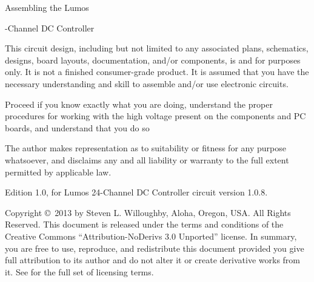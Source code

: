 \documentclass[letterpaper,twoside,onecolumn,openright,final]{memoir}
\begin{document}
\frontmatter

\thispagestyle{empty}
\vfill
\begin{center}
{\HUGE Assembling the Lumos\TM}

\bigskip

{-Channel DC Controller}

\vfill

\end{center}

\newpage
\begin{center}


\end{center}

This circuit design, including but not limited to any associated plans, schematics, designs, board layouts, documentation, 
and/or components, is  and for  purposes only. It is not a finished consumer-grade product.
It is assumed that you have the necessary understanding and skill to assemble and/or use electronic circuits.

Proceed  if you know exactly what you are doing, understand the proper procedures for working with the high voltage present on the components and PC boards, and understand that you do so 

The author makes  representation as to suitability or fitness for any purpose whatsoever, and disclaims any and all liability or warranty to the full extent permitted by applicable law.

\strut\vfill
\noindent Edition 1.0, for Lumos 24-Channel DC Controller circuit version 1.0.8.

\smallskip


\noindent Copyright \copyright\ 2013 by Steven L. Willoughby,
Aloha, Oregon, USA.  All Rights Reserved.  
This document is released under the terms and conditions of the 
Creative Commons ``Attribution-NoDerivs 3.0 Unported'' license.  
In summary, you are free to use, reproduce, and redistribute this 
document provided you give full attribution to its author and do not
alter it or create derivative works from it.  See
 for the full
set of licensing terms.

\begin{center}
\end{center}
\end{document}
